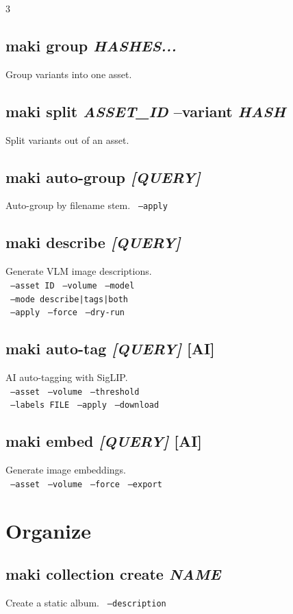 \documentclass[a4paper,landscape,8pt]{article}
\newcommand{\opt}[1]{\texttt{\scriptsize\color{maki-stone} #1}}
\newcommand{\ai}{\textcolor{maki-teal}{\scriptsize [AI]}}
\begin{document}
\begin{multicols}{3}
\subsection{maki group \textit{HASHES...}}
Group variants into one asset.

\subsection{maki split \textit{ASSET\_ID} --variant \textit{HASH}}
Split variants out of an asset.

\subsection{maki auto-group \textit{[QUERY]}}
Auto-group by filename stem. \opt{--apply}

\subsection{maki describe \textit{[QUERY]}}
Generate VLM image descriptions. \\
\opt{--asset ID} \opt{--volume} \opt{--model} \\
\opt{--mode describe|tags|both} \\
\opt{--apply} \opt{--force} \opt{--dry-run}

\subsection{maki auto-tag \textit{[QUERY]} \ai}
AI auto-tagging with SigLIP. \\
\opt{--asset} \opt{--volume} \opt{--threshold} \\
\opt{--labels FILE} \opt{--apply} \opt{--download}

\subsection{maki embed \textit{[QUERY]} \ai}
Generate image embeddings. \\
\opt{--asset} \opt{--volume} \opt{--force} \opt{--export}

\section{Organize}

\subsection{maki collection create \textit{NAME}}
Create a static album. \opt{--description}


\end{multicols}
\end{document}
